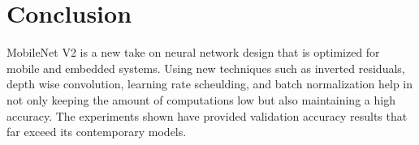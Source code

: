 \documentclass[conference]{IEEEtran}
\begin{document}



\section{Conclusion} %


MobileNet V2 is a new take on neural network design that is optimized for mobile
and embedded systems. Using new techniques such as inverted residuals, depth
wise convolution, learning rate scheulding, and batch normalization help in not
only keeping the amount of computations low but also maintaining a high
accuracy. The experiments shown have provided validation accuracy results that
far exceed its contemporary models.




{\printbibliography}
\end{document}
